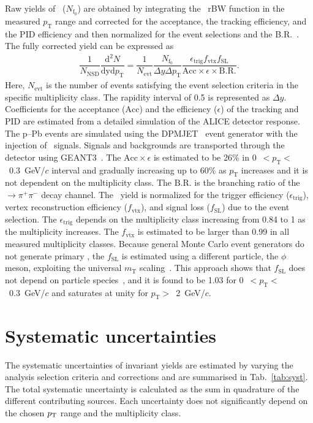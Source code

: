 Raw yields of \fzero~($N_{\mathrm{f}_{0}}$) are obtained by integrating the \fzero~rBW function in the measured $p_{\mathrm{T}}$ range and corrected for the acceptance, the tracking efficiency, and the PID efficiency and then normalized for the event selections and the B.R.~\cite{Stone:2013eaa}. The fully corrected yield can be expressed as
\begin{eqnarray}
\dfrac{1}{N_{\mathrm{NSD}}}\dfrac{\mathrm{d}^{2}N}{\mathrm{dyd}p_{\mathrm{T}}} = \dfrac{1}{N_{\mathrm{evt}}} \dfrac{ N_{\mathrm{f}_{0}} }{ \Delta y \Delta p_{\mathrm{T}} } \dfrac{  \epsilon_{\mathrm{trig}} f_{\mathrm{vtx}} f_{\mathrm{SL}} }{\mathrm{Acc} \times \epsilon \times \mathrm{B.R.} }.
\end{eqnarray}
Here, $N_{\mathrm{evt}}$ is the number of events satisfying the event selection criteria in the specific multiplicity class. The rapidity interval of 0.5 is represented as $\Delta y$. Coefficients for the acceptance ($\mathrm{Acc}$) and the efficiency ($\epsilon$) of the tracking and PID are estimated from a detailed simulation of the ALICE detector response. The p--Pb events are simulated using the DPMJET~\cite{Fedynitch:2015kcn} event generator with the injection of \fzero~signals. Signals and backgrounds are transported through the detector using GEANT3~\cite{Brun:1994aa}. The $\mathrm{Acc}\times\epsilon$ is estimated to be 26\% in 0~$<p_{\mathrm{T}}<$~0.3~GeV/$c$ interval and gradually increasing up to 60\% as $p_{\mathrm{T}}$ increases and it is not dependent on the multiplicity class. The $\mathrm{B.R.}$ is the branching ratio of the \fzero~$\rightarrow \pi^{+}\pi^{-}$ decay channel. The \fzero~yield is normalized for the trigger efficiency ($\epsilon_{\mathrm{trig}}$), vertex reconstruction efficiency ($f_{\mathrm{vtx}}$), and signal loss ($f_{\mathrm{SL}}$) due to the event selection. The $\epsilon_{\mathrm{trig}}$ depends on the multiplicity class increasing from 0.84 to 1 as the multiplicity increases. The $f_{\mathrm{vtx}}$ is estimated to be larger than 0.99 in all measured multiplicity classes. Because general Monte Carlo event generators do not generate primary \fzero, the $f_{\mathrm{SL}}$ is estimated using a different particle, the $\phi$ meson, exploiting the universal $m_{\mathrm{T}}$ scaling~\cite{Altenkamper:2017qot}. This approach shows that $f_{\mathrm{SL}}$ does not depend on particle species~\cite{ALICE:2019xyr}, and it is found to be 1.03 for 0~$<p_{\mathrm{T}}<$~0.3~GeV/$c$ and saturates at unity for $p_{\mathrm{T}}>$~2~GeV/$c$.

\section{Systematic uncertainties}
\label{sec:syst}
The systematic uncertainties of invariant yields are estimated by varying the analysis selection criteria and corrections and are summarised in Tab.~\ref{tab:syst}. The total systematic uncertainty is calculated as the sum in quadrature of the different contributing sources. Each uncertainty does not significantly depend on the chosen $p_{\rm{T}}$ range and the multiplicity class.

